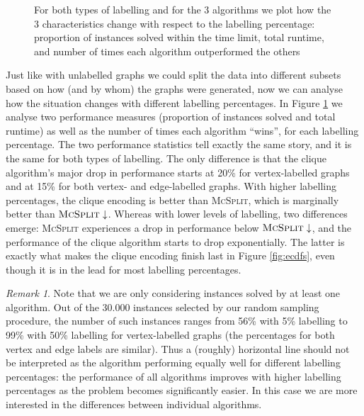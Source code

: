 \documentclass{l4proj}
\theoremstyle{definition}
\theoremstyle{remark}
\newtheorem{remark}{Remark}[chapter]
\begin{document}
\begin{figure}
\begin{subfigure}[t]{0.49\textwidth}
  \end{subfigure}
  \caption{For both types of labelling and for the 3 algorithms we plot how the
    3 characteristics change with respect to the labelling percentage:
    proportion of instances solved within the time limit, total runtime, and
    number of times each algorithm outperformed the others}
  \label{fig:linecharts}
\end{figure}

Just like with unlabelled graphs we could split the data into different subsets
based on how (and by whom) the graphs were generated, now we can analyse how the
situation changes with different labelling percentages. In Figure
\ref{fig:linecharts} we analyse two performance measures (proportion of
instances solved and total runtime) as well as the number of times each
algorithm ``wins'', for each labelling percentage. The two performance
statistics tell exactly the same story, and it is the same for both types of
labelling. The only difference is that the clique algorithm's major drop in
performance starts at 20\% for vertex-labelled graphs and at 15\% for both
vertex- and edge-labelled graphs. With higher labelling percentages, the clique
encoding is better than \textsc{McSplit}, which is marginally better than
$\textsc{McSplit}\downarrow$. Whereas with lower levels of labelling, two
differences emerge: \textsc{McSplit} experiences a drop in performance below
$\textsc{McSplit}\downarrow$, and the performance of the clique algorithm starts
to drop exponentially. The latter is exactly what makes the clique encoding
finish last in Figure \ref{fig:ecdfs}, even though it is in the lead for most
labelling percentages.

\begin{remark}
Note that we are only considering instances solved by at least one algorithm.
Out of the \num{30,000} instances selected by our random sampling procedure, the
number of such instances ranges from 56\% with 5\% labelling to 99\% with 50\%
labelling for vertex-labelled graphs (the percentages for both vertex and edge
labels are similar). Thus a (roughly) horizontal line should not be interpreted
as the algorithm performing equally well for different labelling percentages:
the performance of all algorithms improves with higher labelling percentages as
the problem becomes significantly easier. In this case we are more interested in
the differences between individual algorithms.
\end{remark}
\end{document}
